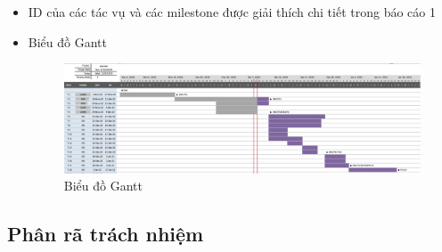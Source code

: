 \documentclass[a4paper, 12pt]{article}
\begin{document}
\begin{itemize}
	\item ID của các tác vụ và các milestone được giải thích chi tiết trong báo cáo 1
	\item Biểu đồ Gantt 
	\begin{figure}[H]
		\begin{center}
			\includegraphics[scale=0.59, angle=90]{./image/gantt.png}
			\caption{Biểu đồ Gantt}
		\end{center}
	\end{figure}
\end{itemize}

\subsection{Phân rã trách nhiệm}
\end{document}
